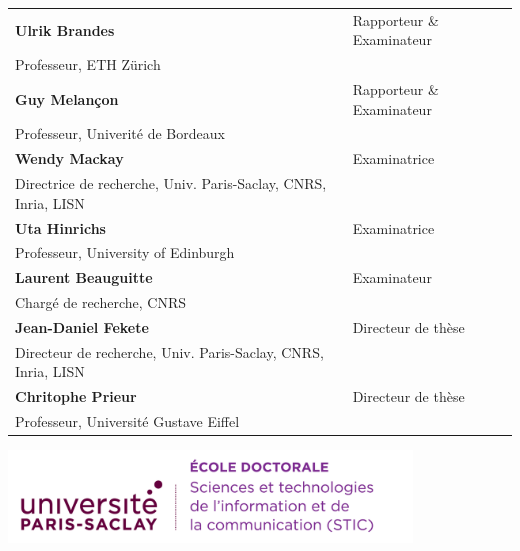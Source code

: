 \documentclass[12pt,a4paper, twoside]{book}
\begin{document}
\begin{titlepage}
        \begin{tabular}{|p{9cm}l}
            \arrayrulecolor{Prune}
            \textbf{Ulrik Brandes} & Rapporteur \& Examinateur \\
            Professeur, ETH Zürich  &                                   \\
            \textbf{Guy Melançon} & Rapporteur \& Examinateur \\
            Professeur, Univerité de Bordeaux  &                                   \\
            \textbf{Wendy Mackay} & Examinatrice       \\
            Directrice de recherche, Univ. Paris-Saclay, CNRS, Inria, LISN  &   \\
            \textbf{Uta Hinrichs} & Examinatrice       \\
            Professeur, University of Edinburgh  &                                   \\
            \textbf{Laurent Beauguitte} & Examinateur       \\
            Chargé de recherche, CNRS  &                                   \\
            \textbf{Jean-Daniel Fekete} & Directeur de thèse  \\
            Directeur de recherche, Univ. Paris-Saclay, CNRS, Inria, LISN  &                                   \\
            \textbf{Chritophe Prieur} & Directeur de thèse  \\
            Professeur, Université Gustave Eiffel  &
        \end{tabular}

    \end{titlepage}

    \Ifthispageodd{\newpage\thispagestyle{empty}\null\newpage}{}
    \thispagestyle{empty}
    \selectfont

    \lhead{}
    \rhead{}
    \rfoot{}
    \cfoot{}
    \lfoot{}

    \noindent
    \includegraphics[height=2.45cm]{static/logos/logo_usp_STIC}
    \vspace{1cm}
    \selectfont
\end{document}
